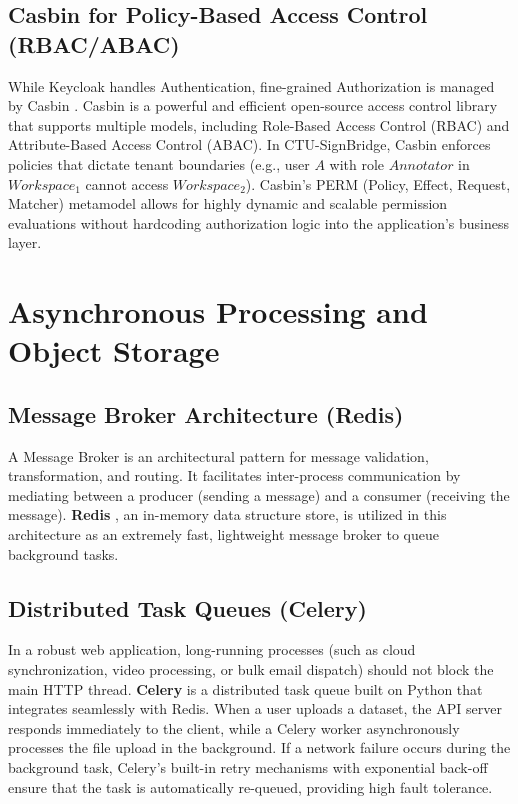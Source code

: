 \subsection{Casbin for Policy-Based Access Control (RBAC/ABAC)}
While Keycloak handles Authentication, fine-grained Authorization is managed by Casbin \cite{casbin2024}. Casbin is a powerful and efficient open-source access control library that supports multiple models, including Role-Based Access Control (RBAC) and Attribute-Based Access Control (ABAC). 
In CTU-SignBridge, Casbin enforces policies that dictate tenant boundaries (e.g., user $A$ with role $Annotator$ in $Workspace_1$ cannot access $Workspace_2$). Casbin's PERM (Policy, Effect, Request, Matcher) metamodel allows for highly dynamic and scalable permission evaluations without hardcoding authorization logic into the application's business layer.

\section{Asynchronous Processing and Object Storage}
\subsection{Message Broker Architecture (Redis)}
A Message Broker is an architectural pattern for message validation, transformation, and routing. It facilitates inter-process communication by mediating between a producer (sending a message) and a consumer (receiving the message). \textbf{Redis} \cite{redis2024}, an in-memory data structure store, is utilized in this architecture as an extremely fast, lightweight message broker to queue background tasks.

\subsection{Distributed Task Queues (Celery)}
In a robust web application, long-running processes (such as cloud synchronization, video processing, or bulk email dispatch) should not block the main HTTP thread. \textbf{Celery} \cite{celery2024} is a distributed task queue built on Python that integrates seamlessly with Redis. 
When a user uploads a dataset, the API server responds immediately to the client, while a Celery worker asynchronously processes the file upload in the background. If a network failure occurs during the background task, Celery's built-in retry mechanisms with exponential back-off ensure that the task is automatically re-queued, providing high fault tolerance.

